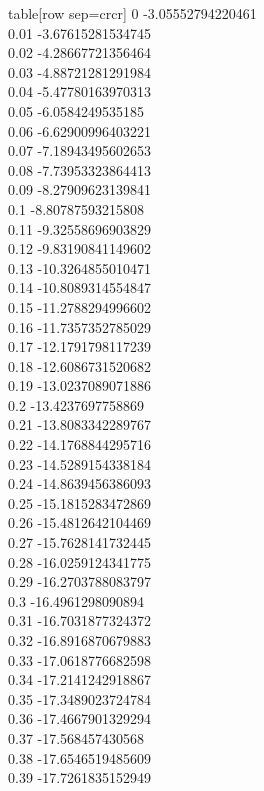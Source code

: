   table[row sep=crcr]{%
0	-3.05552794220461\\
0.01	-3.67615281534745\\
0.02	-4.28667721356464\\
0.03	-4.88721281291984\\
0.04	-5.47780163970313\\
0.05	-6.0584249535185\\
0.06	-6.62900996403221\\
0.07	-7.18943495602653\\
0.08	-7.73953323864413\\
0.09	-8.27909623139841\\
0.1	-8.80787593215808\\
0.11	-9.32558696903829\\
0.12	-9.83190841149602\\
0.13	-10.3264855010471\\
0.14	-10.8089314554847\\
0.15	-11.2788294996602\\
0.16	-11.7357352785029\\
0.17	-12.1791798117239\\
0.18	-12.6086731520682\\
0.19	-13.0237089071886\\
0.2	-13.4237697758869\\
0.21	-13.8083342289767\\
0.22	-14.1768844295716\\
0.23	-14.5289154338184\\
0.24	-14.8639456386093\\
0.25	-15.1815283472869\\
0.26	-15.4812642104469\\
0.27	-15.7628141732445\\
0.28	-16.0259124341775\\
0.29	-16.2703788083797\\
0.3	-16.4961298090894\\
0.31	-16.7031877324372\\
0.32	-16.8916870679883\\
0.33	-17.0618776682598\\
0.34	-17.2141242918867\\
0.35	-17.3489023724784\\
0.36	-17.4667901329294\\
0.37	-17.568457430568\\
0.38	-17.6546519485609\\
0.39	-17.7261835152949\\
}
